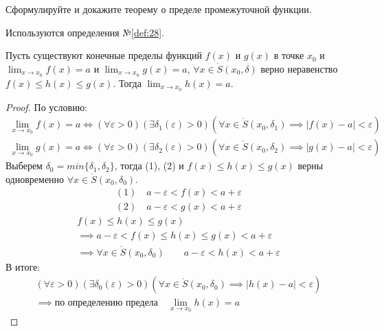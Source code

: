 \begin{question}
    Сформулируйте и докажите теорему о пределе промежуточной функции.
\end{question}
\begin{used}
    Используются определения №\ref{def:28}.
\end{used}
\begin{theorem} 
    Пусть существуют конечные пределы функций $f(x)$ и $g(x)$ в точке  $x_0$ и $\lim_{x \to x_0} f(x) = a$ и $\lim_{x \to x_0} g(x) = a$, $\forall x \in \mathring{S}(x_0, \delta)$ верно неравенство $f(x) \le h(x) \le g(x)$. Тогда $\lim_{x \to x_0} h(x) = a$.
\end{theorem}
\begin{proof}
    По условию: 
    \begin{gather*}
        \lim_{x \to x_0} f(x) = a \iff (\forall \varepsilon > 0)(\exists \delta_1(\varepsilon) > 0)(\forall x \in \mathring{S}(x_0, \delta_1) \implies |f(x) - a| < \varepsilon) \tag{1} \\
        \lim_{x \to x_0} g(x) = a \iff (\forall \varepsilon > 0)(\exists \delta_2(\varepsilon) > 0)(\forall x \in \mathring{S}(x_0, \delta_2) \implies |g(x) - a| < \varepsilon) \tag{2}
    \end{gather*}
    Выберем $\delta_0 = min \{\delta_1, \delta_2\}$, тогда (1), (2) и $f(x) \le h(x) \le g(x)$ верны одновременно $\forall x \in \mathring{S}(x_0, \delta_0)$.
    \begin{align*}
        (1) \quad a - \varepsilon < f(x) < a + \varepsilon \\
        (2) \quad a - \varepsilon < g(x) < a + \varepsilon
    \end{align*}
    \begin{gather*}
        f(x) \le h(x) \le g(x) \\
        \implies a - \varepsilon < f(x) \le h(x) \le g(x) < a + \varepsilon \\
        \implies \forall x \in \mathring{S}(x_0, \delta_0) \qquad a - \varepsilon < h(x) < a + \varepsilon
    \end{gather*}
    В итоге:
    \begin{gather*}
        (\forall \varepsilon > 0)(\exists \delta_0(\varepsilon) > 0)(\forall x \in \mathring{S}(x_0, \delta_0) \implies |h(x) - a| < \varepsilon) \\
        \implies \text{по определению предела} \quad \lim_{x \to x_0} h(x) = a
    \end{gather*}
\end{proof}
\pagebreak



